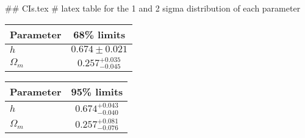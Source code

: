 ## CIs.tex
# latex table for the 1 and 2 sigma distribution of each parameter

\begin{tabular} { l  c}
 Parameter &  68\% limits\\
\hline
{\boldmath$h              $} & $0.674\pm 0.021            $\\
{\boldmath$\Omega_m       $} & $0.257^{+0.035}_{-0.045}   $\\
\hline
\end{tabular}

\begin{tabular} { l  c}
 Parameter &  95\% limits\\
\hline
{\boldmath$h              $} & $0.674^{+0.043}_{-0.040}   $\\
{\boldmath$\Omega_m       $} & $0.257^{+0.081}_{-0.076}   $\\
\hline
\end{tabular}
